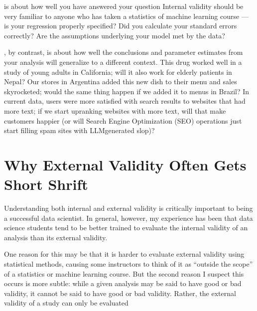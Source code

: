 \documentclass[letterpaper,10pt,english]{jupyterBook}
\begin{document}
\sphinxAtStartPar
{} is about how well you have answered your question  Internal validity should be very familiar to anyone who has taken a statistics of machine learning course — is your regression properly specified? Did you calculate your standard errors correctly? Are the assumptions underlying your model met by the data?

\sphinxAtStartPar
{}, by contrast, is about how well the conclusions and parameter estimates from your analysis will generalize to a different context. This drug worked well in a study of young adults in California; will it also work for elderly patients in Nepal? Our stores in Argentina added this new dish to their menu and sales skyrocketed; would the same thing happen if we added it to menus in Brazil? In current data, users were more satisfied with search results to websites that had more text; if we start up\sphinxhyphen{}ranking websites with more text, will that make customers happier (or will Search Engine Optimization (SEO) operations just start filling spam sites with LLM\sphinxhyphen{}generated slop)?


\section{Why External Validity Often Gets Short Shrift}
\label{\detokenize{30_questions/15_answering_exploratory_questions:why-external-validity-often-gets-short-shrift}}
\sphinxAtStartPar
Understanding both internal and external validity is critically important to being a successful data scientist. In general, however, my experience has been that data science students tend to be better trained to evaluate the internal validity of an analysis than its external validity.

\sphinxAtStartPar
One reason for this may be that it is harder to evaluate external validity using statistical methods, causing some instructors to think of it as “outside the scope” of a statistics or machine learning course. But the second reason I suspect this occurs is more subtle: while a given analysis may be said to have good or bad  validity, it cannot be said to have good or bad  validity. Rather, the external validity of a study can only be evaluated 
\end{document}
